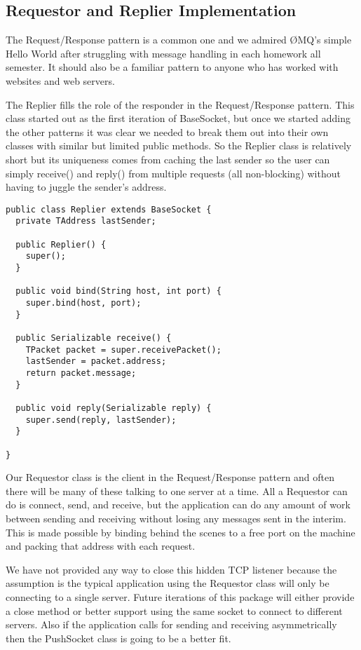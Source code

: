 \documentclass[11pt,journal,compsoc]{IEEEtran}
\begin{document}
\subsection{Requestor and Replier Implementation}

The Request/Response pattern is a common one and we admired ØMQ's simple Hello World after struggling with message handling in each homework all semester. It should also be a familiar pattern to anyone who has worked with websites and web servers.

The Replier fills the role of the responder in the Request/Response pattern. This class started out as the first iteration of BaseSocket, but once we started adding the other patterns it was clear we needed to break them out into their own classes with similar but limited public methods. So the Replier class is relatively short but its uniqueness comes from caching the last sender so the user can simply receive() and reply() from multiple requests (all non-blocking) without having to juggle the sender's address.

\begin{lstlisting}
public class Replier extends BaseSocket {
  private TAddress lastSender;

  public Replier() {
    super();
  }

  public void bind(String host, int port) {
    super.bind(host, port);
  }

  public Serializable receive() {
    TPacket packet = super.receivePacket();
    lastSender = packet.address;
    return packet.message;
  }

  public void reply(Serializable reply) {
    super.send(reply, lastSender);
  }

}

\end{lstlisting}

Our Requestor class is the client in the Request/Response pattern and often there will be many of these talking to one server at a time. All a Requestor can do is connect, send, and receive, but the application can do any amount of work between sending and receiving without losing any messages sent in the interim. This is made possible by binding behind the scenes to a free port on the machine and packing that address with each request.

We have not provided any way to close this hidden TCP listener because the assumption is the typical application using the Requestor class will only be connecting to a single server. Future iterations of this package will either provide a close method or better support using the same socket to connect to different servers. Also if the application calls for sending and receiving asymmetrically then the PushSocket class is going to be a better fit.
\end{document}

